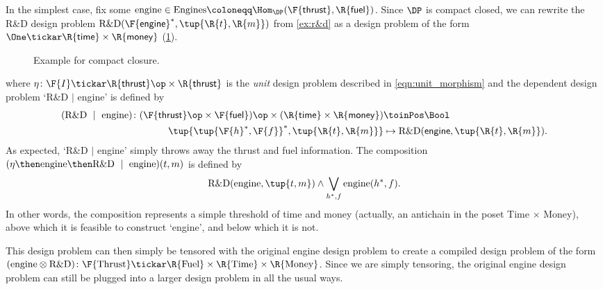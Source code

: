 \begin{example}\label{ex:r&dproblem}
In the simplest case, fix some $\text{engine} \in \text{Engines} \coloneqq \Hom_\DP(\F{\mathsf{thrust}},\R{\mathsf{fuel}})$. Since $\DP$ is compact closed, we can rewrite the R\&D design problem $\text{R\&D}(\F{\mathsf{engine}}^*, \tup{\R{t},\R{m}})$ from \cref{ex:r&d} as a design problem of the form $\One \tickar \R{\mathsf{time}} \times\R{\mathsf{money}}$ (\cref{fig:excompactclosed}).

\begin{figure}[h!]
\begin{center}
\end{center}
\caption{Example for compact closure. \label{fig:excompactclosed}}
\end{figure}
where $\eta \colon \F{I} \tickar \R{\mathsf{thrust}}\op \times \R{\mathsf{thrust}}$ is the \emph{unit} design problem described in \cref{eqn:unit_morphism} and the dependent design problem `R\&D $\mid$ engine' is defined by
\begin{equation}
\begin{aligned}
(\text{R\&D } \mid \text{ engine}) \colon (\F{\mathsf{thrust}}\op \times \F{\mathsf{fuel}})\op \times (\R{\mathsf{time}} \times \R{\mathsf{money}}) &\toinPos \Bool \\
\tup{\tup{\F{h}^*, \F{f}}^*, \tup{\R{t},\R{m}}} &\mapsto \text{R\&D}(\mathsf{engine}, \tup{\R{t},\R{m}}).
\end{aligned}
\end{equation}
As expected, `R\&D $|$ engine' simply throws away the thrust and fuel information. The composition $(\eta \then \text{engine} \then \text{R\&D } \mid \text{ engine}) (t,m)$ is defined by
\begin{equation}
    \text{R\&D}(\text{engine}, \tup{t,m}) \wedge \bigvee_{h^*,f} \text{engine}(h^*, f).
\end{equation}
In other words, the composition represents a simple threshold of time and money (actually, an antichain in the poset Time $\times$ Money), above which it is feasible to construct `engine', and below which it is not.

This design problem can then simply be tensored with the original engine design problem to create a compiled design problem of the form $(\text{engine} \otimes \text{R\&D}) \colon \F{\text{Thrust}} \tickar \R{\text{Fuel}} \times \R{\text{Time}} \times \R{\text{Money}}$. Since we are simply tensoring, the original engine design problem can still be plugged into a larger design problem in all the usual ways.
\end{example}
